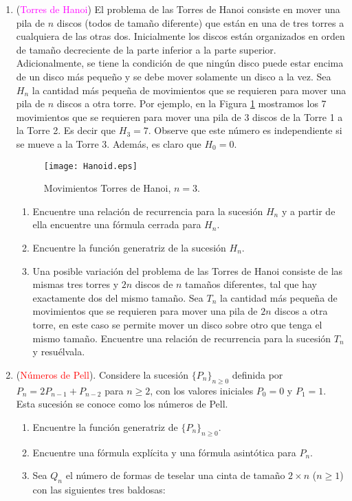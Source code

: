 \documentclass[12pt, oneside]{article}%
\begin{document}
\begin{enumerate}

\item (\textcolor{magenta}{Torres de Hanoi})  El problema de las Torres de Hanoi  consiste en mover una pila de $n$ discos (todos de tamaño diferente) que están en una de tres torres  a cualquiera de las otras dos. Inicialmente los discos  están organizados en orden de tamaño decreciente de la parte inferior a la parte superior. Adicionalmente, se tiene la condición  de que ningún disco puede estar encima de un disco más pequeño y se debe mover solamente un disco a la vez. Sea $H_n$ la cantidad más pequeña de movimientos que se requieren para mover una pila de $n$ discos a otra torre. Por ejemplo, en la Figura \ref{Hanoi2} mostramos los 7 movimientos que se requieren para mover una pila de 3 discos de la Torre 1 a la Torre 2. Es decir que $H_3=7$. Observe que este número es independiente si se mueve a la Torre 3. Además, es claro que $H_0=0$.
\begin{figure}[H]
  \centering
  \texttt{[image: Hanoid.eps]}
  \caption{Movimientos Torres de Hanoi, $n=3$.}\label{Hanoi2}
  \end{figure}
  
\begin{enumerate}
\item Encuentre una relación de recurrencia para la sucesión $H_n$ y a partir de ella encuentre una fórmula cerrada para  $H_n$.
\item Encuentre la función generatriz de la sucesión $H_n$.

\item Una posible variación del problema de las Torres de Hanoi consiste de las mismas tres torres y $2n$ discos de $n$ tamaños diferentes, tal que hay exactamente  dos del mismo tamaño. Sea $T_n$ la cantidad más pequeña de movimientos que se requieren para mover una pila de $2n$ discos a otra torre, en este caso se permite mover un disco sobre otro que tenga el mismo tamaño. Encuentre una relación de recurrencia para la sucesión $T_n$ y resuélvala. 
\end{enumerate}
	\item(\textcolor{red}{Números de Pell}). Considere la sucesión $\{P_n\}_{n\geq 0}$ definida por $P_n=2P_{n-1}+P_{n-2}$ para $n\geq 2$, con los valores iniciales $P_0=0$ y 		$P_1=1$. Esta sucesión se conoce como los números de Pell.
	\begin{enumerate}
		\item Encuentre la función generatriz de $\{P_n\}_{n\geq 0}$.
		\item Encuentre una fórmula explícita y una fórmula asintótica para $P_n$.
		\item Sea $Q_n$ el número de formas de teselar una cinta de tamaño $2\times n$  ($n\geq 1$) con las siguientes tres baldosas:


\end{enumerate}
\end{enumerate}
\end{document}
